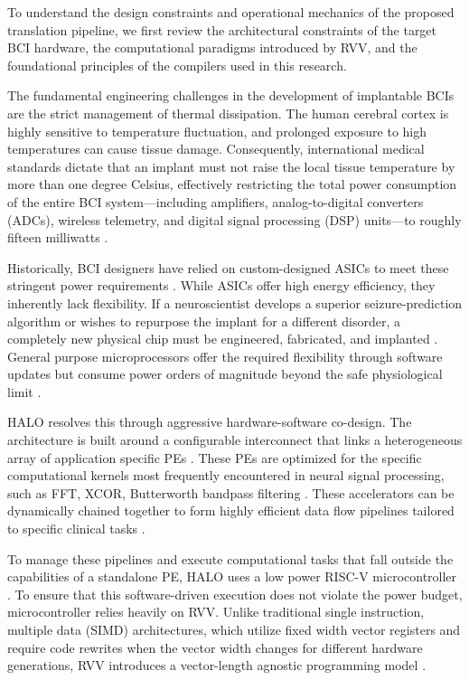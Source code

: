 To understand the design constraints and operational mechanics of the proposed translation pipeline, we first review the architectural constraints of the target BCI hardware, the computational paradigms introduced by RVV, and the foundational principles of the compilers used in this research. 

The fundamental engineering challenges in the development of implantable BCIs are the strict management of thermal dissipation. The human cerebral cortex is highly sensitive to temperature fluctuation, and prolonged exposure to high temperatures can cause tissue damage. Consequently, international medical standards dictate that an implant must not raise the local tissue temperature by more than one degree Celsius, effectively restricting the total power consumption of the entire BCI system—including amplifiers, analog-to-digital converters (ADCs), wireless telemetry, and digital signal processing (DSP) units—to roughly fifteen milliwatts \cite{10120914}.

Historically, BCI designers have relied on custom-designed ASICs to meet these stringent power requirements \cite{7982670} \cite{Musk2019} \cite{Heck2014}. While ASICs offer high energy efficiency, they inherently lack flexibility. If a neuroscientist develops a superior seizure-prediction algorithm or wishes to repurpose the implant for a different disorder, a completely new physical chip must be engineered, fabricated, and implanted \cite{9138938}. General purpose microprocessors offer the required flexibility through software updates but consume power orders of magnitude beyond the safe physiological limit \cite{10120914}.

HALO resolves this through aggressive hardware-software co-design. The architecture is built around a configurable interconnect that links a heterogeneous array of application specific PEs \cite{9138938}. These PEs are optimized for the specific computational  kernels most frequently encountered in neural signal processing, such as FFT, XCOR, Butterworth bandpass filtering \cite{10120914}. These accelerators can be dynamically chained together to form highly efficient data flow pipelines tailored to specific clinical tasks \cite{9138938}.

To manage these pipelines and execute computational tasks that fall outside the capabilities of a standalone PE, HALO uses a low power RISC-V microcontroller \cite{9138938}. To ensure that this software-driven execution does not violate the power budget, microcontroller relies heavily on RVV. Unlike traditional single instruction, multiple data (SIMD) architectures, which utilize fixed width vector registers and require code rewrites when the vector width changes for different hardware generations, RVV introduces a vector-length agnostic programming model \cite{pipicelli2020quantum}.

